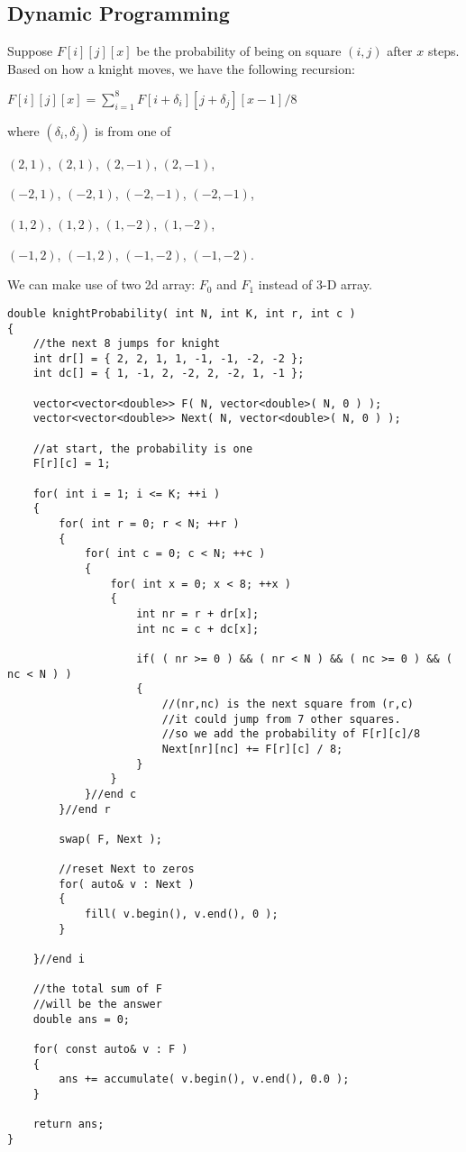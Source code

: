 \subsection{Dynamic Programming}
Suppose $F[i][j][x]$ be the probability of being on square $(i,j)$ after $x$ steps. Based on how a knight moves, we have the following recursion:

$F[i][j][x] = \sum\limits_{i=1}^{8}F[i+\delta_i][j+\delta_j][x-1] / 8$

where $(\delta_i, \delta_j)$ is from one of 

$(2, 1)$, $(2,1)$, $ (2, -1) $, $ (2,−1) $, 

$ (-2, 1) $, $ (−2,1) $, $ (-2, -1) $, $ (−2,−1) $, 

$ (1, 2) $, $ (1,2) $, $ (1, -2) $, $ (1,−2) $, 

$ (-1, 2) $, $ (−1,2) $, $ (-1, -2) $, $ (−1,−2) $.

We can make use of two 2d array: $F_0$ and $F_1$ instead of 3-D array.

\setcounter{lstlisting}{0}
\begin{lstlisting}[style=customc, caption={Dynamic Programming}]
double knightProbability( int N, int K, int r, int c )
{
    //the next 8 jumps for knight
    int dr[] = { 2, 2, 1, 1, -1, -1, -2, -2 };
    int dc[] = { 1, -1, 2, -2, 2, -2, 1, -1 };

    vector<vector<double>> F( N, vector<double>( N, 0 ) );
    vector<vector<double>> Next( N, vector<double>( N, 0 ) );

    //at start, the probability is one
    F[r][c] = 1;

    for( int i = 1; i <= K; ++i )
    {
        for( int r = 0; r < N; ++r )
        {
            for( int c = 0; c < N; ++c )
            {
                for( int x = 0; x < 8; ++x )
                {
                    int nr = r + dr[x];
                    int nc = c + dc[x];

                    if( ( nr >= 0 ) && ( nr < N ) && ( nc >= 0 ) && ( nc < N ) )
                    {
                        //(nr,nc) is the next square from (r,c)
                        //it could jump from 7 other squares.
                        //so we add the probability of F[r][c]/8
                        Next[nr][nc] += F[r][c] / 8;
                    }
                }
            }//end c
        }//end r

        swap( F, Next );

        //reset Next to zeros
        for( auto& v : Next )
        {
            fill( v.begin(), v.end(), 0 );
        }

    }//end i

    //the total sum of F
    //will be the answer
    double ans = 0;

    for( const auto& v : F )
    {
        ans += accumulate( v.begin(), v.end(), 0.0 );
    }

    return ans;
}
\end{lstlisting}